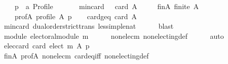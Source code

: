 \begin{isabellebody}
\ \ \ \ p\ {\isacharcolon}{\kern0pt}{\isacharcolon}{\kern0pt}\ {\isachardoublequoteopen}{\isacharprime}{\kern0pt}a\ Profile{\isachardoublequoteclose}\isanewline
\ \ \isamarkupfalse%
\isanewline
\ \ \ \ min{\isacharunderscore}{\kern0pt}{}{\isacharunderscore}{\kern0pt}card{\isacharcolon}{\kern0pt}\ {\isachardoublequoteopen}{}\ {\isacharless}{\kern0pt}\ card\ A{\isachardoublequoteclose}\ \isanewline
\ \ \ \ fin{\isacharunderscore}{\kern0pt}A{\isacharcolon}{\kern0pt}\ {\isachardoublequoteopen}finite\ A{\isachardoublequoteclose}\ \isanewline
\ \ \ \ prof{\isacharunderscore}{\kern0pt}A{\isacharcolon}{\kern0pt}\ {\isachardoublequoteopen}profile\ A\ p{\isachardoublequoteclose}\isanewline
\ \ \isamarkupfalse%
\ card{\isacharunderscore}{\kern0pt}geq{\isacharunderscore}{\kern0pt}{}{\isacharcolon}{\kern0pt}\ {\isachardoublequoteopen}card\ A\ {\isasymge}\ {}{\isachardoublequoteclose}\isanewline
\ \ \ \ \isamarkupfalse%
\ min{\isacharunderscore}{\kern0pt}{}{\isacharunderscore}{\kern0pt}card\ dual{\isacharunderscore}{\kern0pt}order{\isachardot}{\kern0pt}strict{\isacharunderscore}{\kern0pt}trans{}\ less{\isacharunderscore}{\kern0pt}imp{\isacharunderscore}{\kern0pt}le{\isacharunderscore}{\kern0pt}nat\isanewline
\ \ \ \ \isamarkupfalse%
\ blast\isanewline
\ \ \isamarkupfalse%
\ module{\isacharcolon}{\kern0pt}\ {\isachardoublequoteopen}electoral{\isacharunderscore}{\kern0pt}module\ m{\isachardoublequoteclose}\isanewline
\ \ \ \ \isamarkupfalse%
\ non{\isacharunderscore}{\kern0pt}elec{\isacharunderscore}{\kern0pt}m\ non{\isacharunderscore}{\kern0pt}electing{\isacharunderscore}{\kern0pt}def\isanewline
\ \ \ \ \isamarkupfalse%
\ auto\isanewline
\ \ \isamarkupfalse%
\ elec{\isacharunderscore}{\kern0pt}card{\isacharunderscore}{\kern0pt}{}{\isacharcolon}{\kern0pt}\ {\isachardoublequoteopen}card\ {\isacharparenleft}{\kern0pt}elect\ m\ A\ p{\isacharparenright}{\kern0pt}\ {\isacharequal}{\kern0pt}\ {}{\isachardoublequoteclose}\isanewline
\ \ \ \ \isamarkupfalse%
\ fin{\isacharunderscore}{\kern0pt}A\ prof{\isacharunderscore}{\kern0pt}A\ non{\isacharunderscore}{\kern0pt}elec{\isacharunderscore}{\kern0pt}m\ card{\isacharunderscore}{\kern0pt}eq{\isacharunderscore}{\kern0pt}{}{\isacharunderscore}{\kern0pt}iff\ non{\isacharunderscore}{\kern0pt}electing{\isacharunderscore}{\kern0pt}def\isanewline
\ \ \ \ \isamarkupfalse%

\end{isabellebody}
